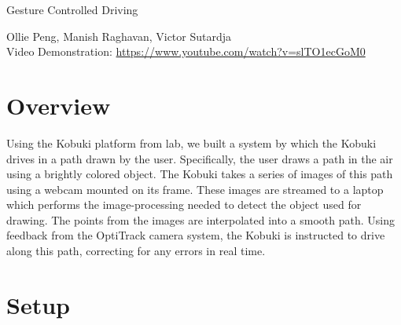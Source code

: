\documentclass[10pt]{article}
\newenvironment{Figure}
  {\par\medskip\noindent\minipage{\linewidth}}
  {\endminipage\par\medskip}
\def\videolink{\url{https://www.youtube.com/watch?v=slTO1ecGoM0}}
\begin{document}
\begin{center}
  \Large Gesture Controlled Driving
\end{center}
\begin{center}
  Ollie Peng, Manish Raghavan, Victor Sutardja \\
  Video Demonstration: \videolink{}
\end{center}
\begin{multicols*}{2}
  \section*{Overview}
  Using the Kobuki platform from lab, we built a system by which the Kobuki
  drives in a path drawn by the user. Specifically, the user draws a path in the
  air using a brightly colored object. The Kobuki takes a series of images of
  this path using a webcam mounted on its frame. These images are streamed to a
  laptop which performs the image-processing needed to detect the object used
  for drawing. The points from the images are interpolated into a smooth path.
  Using feedback from the OptiTrack camera system, the Kobuki is instructed to
  drive along this path, correcting for any errors in real time.

  \section*{Setup}
  \begin{Figure}
     \label{fig:info}
  \end{Figure}


\end{multicols*}
\end{document}
